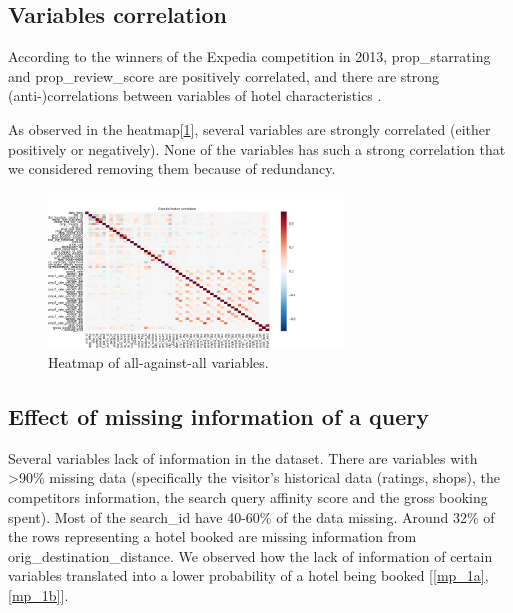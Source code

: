 \documentclass[9pt]{llncs}
\begin{document}
\subsection{Variables correlation}
According to the winners of the Expedia competition in 2013, 
prop\_starrating and prop\_review\_score are positively correlated, and there are strong (anti-)correlations between variables of hotel characteristics \cite{ExpediaHttps://www.kaggle.com/c/expedia-personalized-sort/discussion/6203}.


As observed in the heatmap[\ref{heatmap}], several variables are strongly correlated (either positively or negatively). None of the variables has such a strong correlation that we considered removing them because of redundancy.

\begin{figure}%
\centering
	\includegraphics[width=0.7\textwidth]{feature_correlation_whole_dataset.png}
	\caption{Heatmap of all-against-all variables. }
    \label{heatmap}
\end{figure}

\subsection{Effect of missing information of a query}
Several variables lack of information in the dataset.
There are variables with >90\% missing data (specifically the visitor’s historical data (ratings, shops),  the competitors information, the search query affinity score and the gross booking spent).
Most of the search\_id have 40-60\% of the data missing.
Around 32\% of the rows representing a hotel booked are missing information from orig\_destination\_distance.
We observed how the lack of information of certain variables translated into a lower probability of a hotel being booked [\ref{mp_1a}, \ref{mp_1b}].
\end{document}
